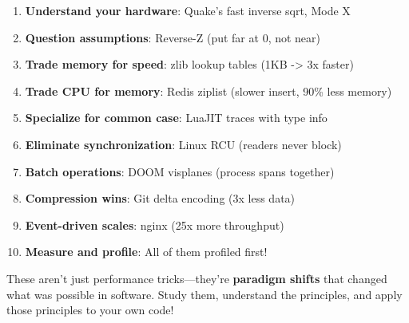 \begin{enumerate}
    \item \textbf{Understand your hardware}: Quake's fast inverse sqrt, Mode X
    \item \textbf{Question assumptions}: Reverse-Z (put far at 0, not near)
    \item \textbf{Trade memory for speed}: zlib lookup tables (1KB -> 3x faster)
    \item \textbf{Trade CPU for memory}: Redis ziplist (slower insert, 90\% less memory)
    \item \textbf{Specialize for common case}: LuaJIT traces with type info
    \item \textbf{Eliminate synchronization}: Linux RCU (readers never block)
    \item \textbf{Batch operations}: DOOM visplanes (process spans together)
    \item \textbf{Compression wins}: Git delta encoding (3x less data)
    \item \textbf{Event-driven scales}: nginx (25x more throughput)
    \item \textbf{Measure and profile}: All of them profiled first!
\end{enumerate}

These aren't just performance tricks---they're \textbf{paradigm shifts} that changed what was possible in software. Study them, understand the principles, and apply those principles to your own code!
